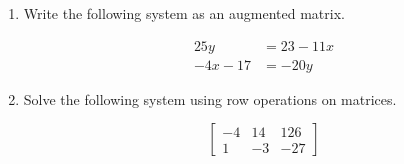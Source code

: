 \documentclass[11pt]{article}
\begin{document}
\begin{enumerate}
{{}
}

\newpage

% 

\item %
\providecommand{\stxKnowl}{}\renewcommand{\stxKnowl}[1]{#1}
\providecommand{\stxOuttro}{}\renewcommand{\stxOuttro}[1]{#1}
\providecommand{\stxTitle}{}\renewcommand{\stxTitle}[1]{#1}
\renewcommand{\stxOuttro}[1]{}
\stxKnowl{
Write the following system as an augmented matrix.

\[\begin{aligned} 25y &= 23 - 11x \\ -4x - 17 &= -20y \end{aligned}\]

\stxOuttro{
Solution

\[\begin{aligned} 11x + 25y &= 23 \\ -4x + 20y &= 17 \end{aligned}\]

\[\boxed{ \left[\begin{array}{cc|c} 11 & 25 & 23 \\ -4 & 20 & 17 \end{array}\right] }\]

}
}

\newpage

% 

\item %
\providecommand{\stxKnowl}{}\renewcommand{\stxKnowl}[1]{#1}
\providecommand{\stxOuttro}{}\renewcommand{\stxOuttro}[1]{#1}
\providecommand{\stxTitle}{}\renewcommand{\stxTitle}[1]{#1}
\renewcommand{\stxOuttro}[1]{}
\stxKnowl{
Solve the following system using row operations on matrices.

\[\left[\begin{array}{cc|c} -4 & 14 & 126 \\ 1 & -3 & -27 \end{array}\right]\]

\stxOuttro{
Solution

}}
\end{enumerate}
\end{document}
